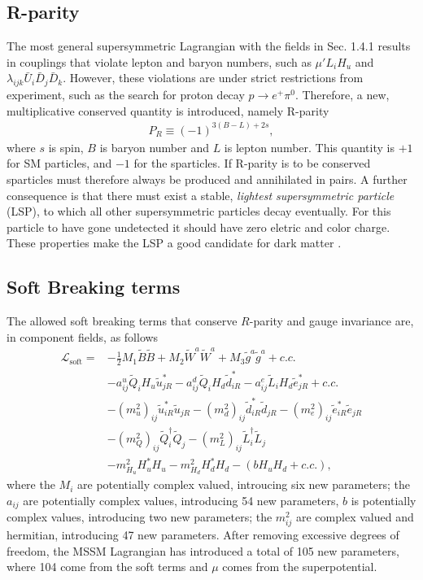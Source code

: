 \documentclass[twoside,english]{uiofysmaster}
\begin{document}
\subsection{R-parity}

The most general supersymmetric Lagrangian with the fields in Sec. 1.4.1 results in couplings that violate lepton and baryon numbers, such as $\mu' L_i H_u$ and $ \lambda_{ijk} \bar{U}_i \bar{D}_j \bar{D}_k $. However, these violations are under strict restrictions from experiment, such as the search for proton decay $p \rightarrow e^+ \pi^0$. Therefore, a new, multiplicative conserved quantity is introduced, namely R-parity
\begin{align}\label{Eq:: R-parity}
P_R \equiv (-1)^{3(B-L) +2s},
\end{align}
where $s$ is spin, $B$ is baryon number and $L$ is lepton number. This quantity is $+1$ for SM particles, and $-1$ for the sparticles. If R-parity is to be conserved sparticles must therefore always be produced and annihilated in pairs. A further consequence is that there must exist a stable, \textit{lightest supersymmetric particle} (LSP), to which all other supersymmetric particles decay eventually. For this particle to have gone undetected it should have zero eletric and color charge. These properties make the LSP a good candidate for dark matter \cite{weinberg_1995}.

\subsection{Soft Breaking terms}

The allowed soft breaking terms that conserve $R$-parity and gauge invariance are, in component fields, as follows
\begin{align}
\mathcal{L}_{\text{soft}} =& - \frac{1}{2} M_1 \tilde{B} \tilde{B} + M_2 \tilde{W}^a \tilde{W}^a + M_3 \tilde{g}^a \tilde{g}^a + c.c. \nonumber \\
&- a_{ij}^u \tilde{Q}_i H_u \tilde{u}_{jR}^* - a_{ij}^d \tilde{Q}_i H_d \tilde{d}_{iR}^* - a_{ij}^e \tilde{L}_i H_d \tilde{e}_{jR}^* + c.c. \nonumber \\
& -(m_u^2)_{ij} \tilde{u}_{iR}^* \tilde{u}_{jR} - (m_d^2)_{ij} \tilde{d}_{iR}^* \tilde{d}_{jR} - (m_e^2)_{ij} \tilde{e}_{iR}^* \tilde{e}_{jR} \nonumber \\
& - (m_Q^2)_{ij} \tilde{Q}_i^{\dagger} \tilde{Q}_j - (m_L^2)_{ij} \tilde{L}_i^{\dagger} \tilde{L}_j \nonumber \\
& - m_{H_u}^2 H_u^*H_u - m_{H_d}^2 H_d^* H_d - (b H_u H_d + c.c.),
\end{align}
where the $M_i$ are potentially complex valued, introucing six new parameters; the $a_{ij}$ are potentially complex values, introducing 54 new parameters, $b$ is potentially complex values, introducing two new parameters; the $m_{ij}^2$ are complex valued and hermitian, introducing 47 new parameters. After removing excessive degrees of freedom, the MSSM Lagrangian has introduced a total of 105 new parameters, where 104 come from the soft terms and $\mu$ comes from the superpotential.
\end{document}
